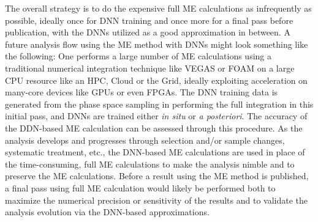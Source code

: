 The overall strategy is to do the expensive full ME calculations as
infrequently as possible, ideally once for DNN training and once more
for a final pass before publication, with the DNNs utilized as a good
approximation in between. A future analysis flow using the ME method
with DNNs might look something like the following: One performs a
large number of ME calculations using a traditional numerical
integration technique like {\sf VEGAS} or {\sf FOAM} on a large CPU
resource like an HPC, Cloud or the Grid, ideally exploiting
acceleration on many-core devices like GPUs or even FPGAs. The DNN
training data is generated from the phase space sampling in performing
the full integration in this initial pass, and DNNs are trained
either \emph{in situ} or \emph{a posteriori}. The accuracy of the
DDN-based ME calculation can be assessed through this procedure. As
the analysis develops and progresses through selection and/or sample
changes, systematic treatment, etc., the DNN-based ME calculations are
used in place of the time-consuming, full ME calculations to make the
analysis nimble and to preserve the ME calculations. Before a result
using the ME method is published, a final pass using full ME
calculation would likely be performed both to maximize the numerical
precision or sensitivity of the results and to validate the analysis
evolution via the DNN-based approximations.


